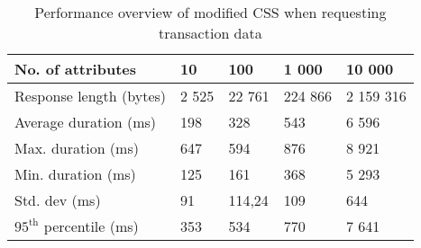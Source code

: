 \begin{table}[H]
\begin{subtable}{1.0\textwidth}
\centering
\begin{tabular}{lllll}
\textbf{No. of attributes} & \multicolumn{1}{l}{\textbf{10}} & \multicolumn{1}{l}{\textbf{100}} & \multicolumn{1}{l}{\textbf{1 000}} & \multicolumn{1}{l}{\textbf{10 000}} \\ \hline
Response length (bytes)    & 2 525                           & 22 761                           & 224 866                            & 2 159 316                           \\
Average duration (ms)      & 198                          & 328                           & 543                             & 6 596                            \\
Max. duration (ms)         & 647                             & 594                              & 876                                & 8 921                               \\
Min. duration (ms)         & 125                             & 161                              & 368                                & 5 293                               \\
Std. dev (ms)              & 91                           & 114,24                           & 109                             & 644                              \\
$95^{\text{th}}$ percentile (ms)       & 353                          & 534                           & 770                              & 7 641                            
\end{tabular}
\caption{Performance overview of modified \acrshort{CSS} when requesting transaction data}
\label{table:results-modified-json}
\end{subtable}

\vspace*{0.5 cm}


\end{table}
